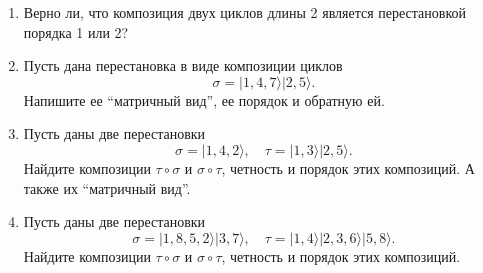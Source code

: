 \begin{enumerate}
    \item Верно ли, что композиция двух циклов длины 2 является перестановкой порядка 1 или 2?
    \item Пусть дана перестановка в виде композиции циклов  \[
            \sigma = | 1, 4, 7 \rangle |2, 5 \rangle
        .\]  
        Напишите ее ``матричный вид'', ее порядок и обратную ей.
    \item Пусть даны две перестановки \[
            \sigma = | 1, 4, 2 \rangle 
            , \quad
            \tau = | 1, 3 \rangle | 2, 5 \rangle
        .\]
        Найдите композиции $\tau \circ \sigma$ и $\sigma \circ \tau$, четность и порядок этих композиций.
        А также их ``матричный вид''.
    \item Пусть даны две перестановки \[
            \sigma = | 1, 8, 5, 2 \rangle | 3, 7 \rangle
            , \quad
            \tau = | 1, 4\rangle |2,  3, 6 \rangle | 5, 8 \rangle
            .
        \]
        Найдите композиции $\tau \circ \sigma$ и $\sigma \circ \tau$, четность и порядок этих композиций.

\end{enumerate}
